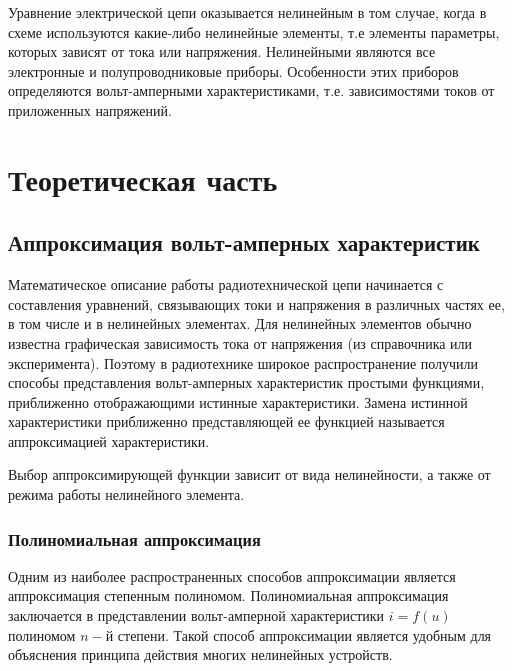 Уравнение электрической цепи оказывается нелинейным в том случае, когда в схеме используются какие-либо нелинейные элементы, т.е элементы параметры, которых зависят от тока или напряжения. Нелинейными являются все электронные и полупроводниковые приборы. Особенности этих приборов определяются вольт-амперными характеристиками, т.е. зависимостями токов от приложенных напряжений. 
\section{Теоретическая часть}
\subsection{Аппроксимация вольт-амперных характеристик}
Математическое описание работы радиотехнической цепи начинается с составления уравнений, связывающих токи и напряжения в различных частях ее, в том числе и в нелинейных элементах. Для нелинейных элементов обычно известна графическая зависимость тока от напряжения (из справочника или эксперимента). Поэтому в радиотехнике широкое распространение получили способы представления вольт-амперных характеристик простыми функциями, приближенно отображающими истинные характеристики. Замена истинной характеристики приближенно представляющей ее функцией называется аппроксимацией характеристики.

Выбор аппроксимирующей функции зависит от вида нелинейности, а также от режима работы нелинейного элемента.
\subsubsection{Полиномиальная аппроксимация}
Одним из наиболее распространенных способов аппроксимации является аппроксимация степенным полиномом. Полиномиальная аппроксимация заключается в представлении вольт-амперной характеристики $i=f(u)$ полиномом $n-$й степени. Такой способ аппроксимации является удобным для объяснения принципа действия многих нелинейных устройств.

